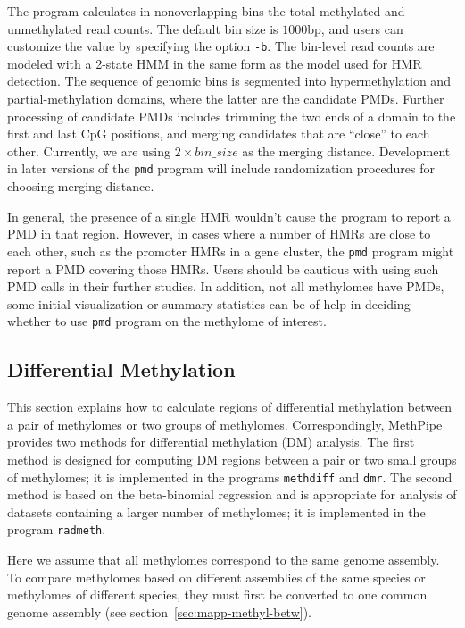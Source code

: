 \documentclass[10pt]{article}
\newcommand{\prog}[1]{\texttt{#1}}
\newcommand{\op}[1]{\texttt{#1}}
\begin{document}
The program calculates in nonoverlapping bins the total methylated and
unmethylated read counts. The default bin size is $1000$bp, and users
can customize the value by specifying the option \op{-b}. The bin-level read
counts are modeled with a 2-state HMM in the same form
as the model used for HMR detection. The sequence of genomic bins is
segmented into hypermethylation and partial-methylation domains, where
the latter are the candidate PMDs. Further processing of candidate
PMDs includes trimming the two ends of a domain to the first and last
CpG positions, and merging candidates that are ``close'' to each
other. Currently, we are using $2\times bin\_size$ as the merging
distance. Development in later versions of the \prog{pmd} program will
include randomization procedures for choosing merging distance. 

In general, the presence of a single HMR wouldn't cause the program to
report a PMD in that region. However, in cases where a number of HMRs
are close to each other, such as the promoter HMRs in a gene cluster,
the \prog{pmd} program might report a PMD covering those HMRs. Users
should be cautious with using such PMD calls in their further
studies. In addition, not all methylomes have PMDs, some initial
visualization or summary statistics can be of help in deciding whether
to use \prog{pmd} program on the methylome of interest.

\subsection{Differential Methylation}
\label{sec:differential_methylation}

This section explains how to calculate regions of differential methylation 
between a pair of methylomes or two groups of methylomes. Correspondingly, 
MethPipe provides two methods for differential methylation (DM) analysis. 
The first method is designed for computing DM regions between a pair or two 
small groups of methylomes; it is implemented in the programs \prog{methdiff} 
and \prog{dmr}. The second method is based on the beta-binomial 
regression and is appropriate for analysis of datasets containing a larger 
number of methylomes; it is implemented in the program \prog{radmeth}.

Here we assume that all methylomes correspond to the same genome 
assembly. To compare methylomes based on different assemblies of the 
same species or methylomes of different species, they must first be 
converted to one common genome assembly (see 
section~\ref{sec:mapp-methyl-betw}).
\end{document}
